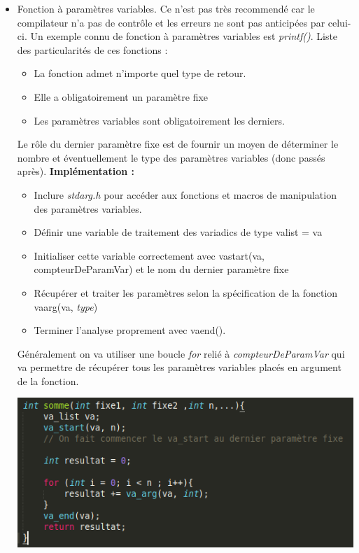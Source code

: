 \documentclass[12pt,a4paper]{article}
\begin{document}
\begin{itemize}
\item Fonction à paramètres variables. Ce n’est pas très recommendé car le compilateur n’a pas de contrôle et les erreurs ne sont pas anticipées par celui-ci. Un exemple connu de fonction à paramètres variables est \textit{printf()}.
\newline Liste des particularités de ces fonctions : 
\begin{itemize}
\item La fonction admet n'importe quel type de retour. 
\item Elle a obligatoirement un paramètre fixe 
\item Les paramètres variables sont obligatoirement les derniers. 
\end{itemize}
Le rôle du dernier paramètre fixe est de fournir un moyen de déterminer le nombre et éventuellement le type des paramètres variables (donc passés après). 
\newline \textbf{Implémentation :}
\begin{itemize}
\item Inclure \textit{stdarg.h} pour accéder aux fonctions et macros de manipulation des paramètres variables. 
\item Définir une variable de traitement des variadics de type va\textunderscore list = va
\item Initialiser cette variable correctement avec va\textunderscore start(va, compteurDeParamVar) et le nom du dernier paramètre fixe 
\item Récupérer et traiter les paramètres selon la spécification de la fonction va\textunderscore arg(va, \textit{type})
\item Terminer l'analyse proprement avec va\textunderscore end().
\end{itemize}
Généralement on va utiliser une boucle \textit{for} relié à \textit{compteurDeParamVar} qui va permettre de récupérer tous les paramètres variables placés en argument de la fonction.
\begin{center}
\includegraphics[scale=0.6]{fonctionParamVar}
\end{center}
\end{itemize}
\end{document}
